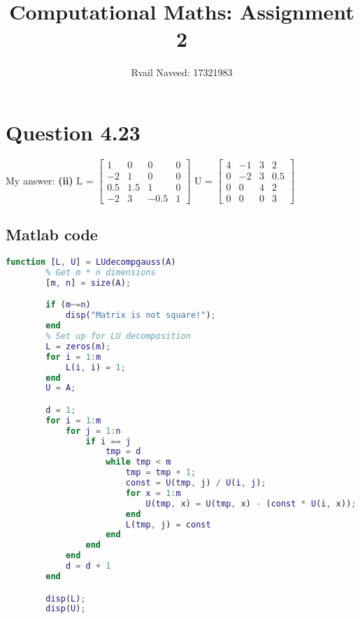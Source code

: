 \documentclass{article}
\title{Computational Maths: Assignment 2}
\author{Rvail Naveed: 17321983}
\begin{document}
    \maketitle
    \newpage

    \section{Question 4.23}
        My answer: \textbf{(ii)}
        L = 
        $\begin{bmatrix}
            1 & 0 & 0 & 0 \\
            -2 & 1 & 0 & 0 \\
            0.5 & 1.5 & 1 & 0 \\ 
            -2 & 3 & -0.5 & 1
        \end{bmatrix}$
        U = 
        $\begin{bmatrix}
            4 & -1 & 3 & 2 \\ 
            0 & -2 & 3 & 0.5 \\ 
            0 & 0 & 4 & 2 \\ 
            0 & 0 & 0 & 3
        \end{bmatrix}$
        
        \subsection{Matlab code}
        \begin{lstlisting}[language=Matlab]
        function [L, U] = LUdecompgauss(A)
        % Get m * n dimensions
        [m, n] = size(A);

        if (m~=n)
            disp("Matrix is not square!");
        end
        % Set up for LU decomposition
        L = zeros(m);
        for i = 1:m
            L(i, i) = 1;
        end
        U = A;

        d = 1;
        for i = 1:m
            for j = 1:n
                if i == j
                    tmp = d
                    while tmp < m
                        tmp = tmp + 1;
                        const = U(tmp, j) / U(i, j);
                        for x = 1:m
                            U(tmp, x) = U(tmp, x) - (const * U(i, x));
                        end
                        L(tmp, j) = const
                    end
                end
            end
            d = d + 1
        end

        disp(L);
        disp(U);
        \end{lstlisting}
    
\end{document}
